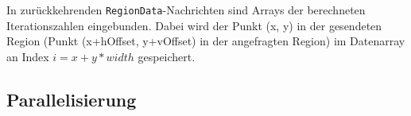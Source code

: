 In zurückkehrenden \verb|RegionData|-Nachrichten sind Arrays der berechneten Iterationszahlen eingebunden.
Dabei wird der Punkt (x, y) in der gesendeten Region (Punkt (x+hOffset, y+vOffset) in der angefragten Region)
im Datenarray an Index $i = x + y * width$ gespeichert.


\subsection{Parallelisierung}